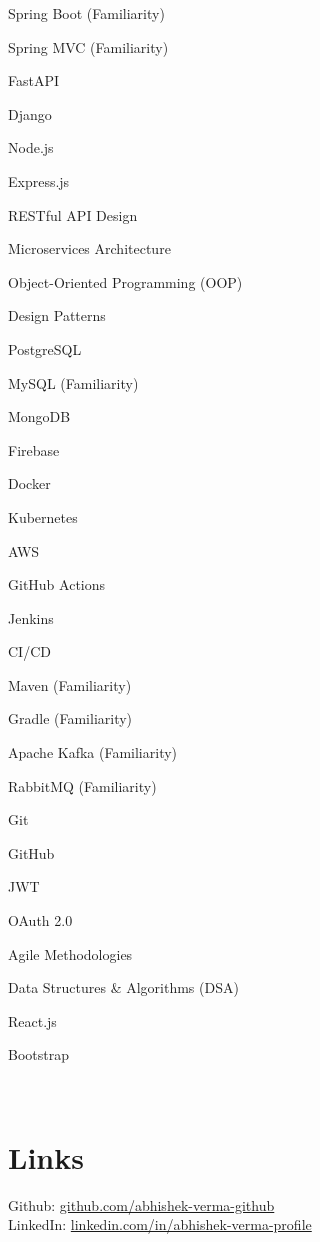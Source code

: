 \documentclass[letterpaper]{deedy-resume}
\begin{document}
\begin{minipage}[t]{0.33\textwidth}
Spring Boot (Familiarity) \textbullet{} 

Spring MVC (Familiarity) \textbullet{} 

FastAPI \textbullet{} 

Django \textbullet{} 

Node.js \textbullet{} 

Express.js \textbullet{} 

RESTful API Design \textbullet{} 

Microservices Architecture \textbullet{} 

Object-Oriented Programming (OOP) \textbullet{} 

Design Patterns \textbullet{} 

PostgreSQL \textbullet{} 

MySQL (Familiarity) \textbullet{} 

MongoDB \textbullet{} 

Firebase \textbullet{} 

Docker \textbullet{} 

Kubernetes \textbullet{} 

AWS \textbullet{} 

GitHub Actions \textbullet{} 

Jenkins \textbullet{} 

CI/CD \textbullet{} 

Maven (Familiarity) \textbullet{} 

Gradle (Familiarity) \textbullet{} 

Apache Kafka (Familiarity) \textbullet{} 

RabbitMQ (Familiarity) \textbullet{} 

Git \textbullet{} 

GitHub \textbullet{} 

JWT \textbullet{} 

OAuth 2.0 \textbullet{} 

Agile Methodologies \textbullet{} 

Data Structures \& Algorithms (DSA) \textbullet{} 

React.js \textbullet{} 

Bootstrap

 \\
\sectionspace


\section{Links} 
Github: \href{https://github.com/abhishek-verma-github}{github.com/abhishek-verma-github} \\
LinkedIn: \href{https://linkedin.com/in/abhishek-verma-profile}{linkedin.com/in/abhishek-verma-profile} \\
\sectionspace 
\end{minipage} 
\end{document}
